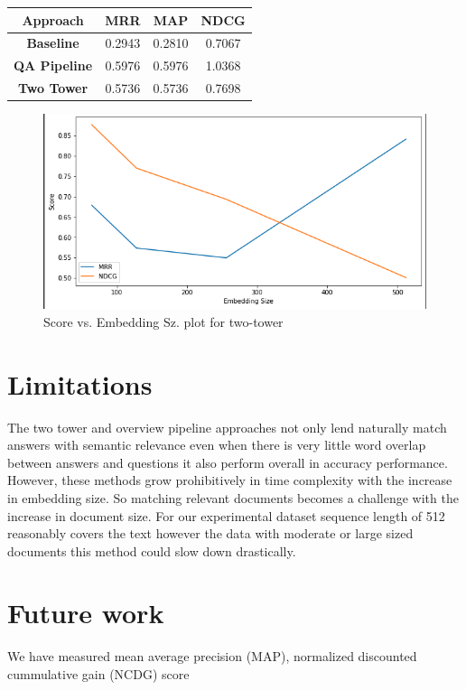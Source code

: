 \documentclass[11pt,a4paper]{article}
\begin{document}
\begin{center}
\begin{tabular}{||c c c c||} 
 \hline
 \textbf{Approach} & \textbf{MRR} & \textbf{MAP} & \textbf{NDCG} \\ [0.5ex] 
 \hline\hline
 \textbf{Baseline} & 0.2943 & 0.2810 & 0.7067 \\ 
 \hline
 \textbf{QA Pipeline} & 0.5976 & 0.5976 & 1.0368 \\
 \hline
 \textbf{Two Tower} & 0.5736 & 0.5736 & 0.7698 \\
 \hline

 \hline
\end{tabular}
\end{center}

\begin{figure}
  \includegraphics[width=\linewidth]{metric_plot.png}
  \caption{Score vs. Embedding Sz. plot for two-tower}
  \label{fig:two-tower model}
\end{figure}


\section{Limitations}
The two tower and overview pipeline approaches not only lend naturally match answers with semantic relevance even when there is very little word overlap between answers and questions it also perform overall in accuracy performance. However, these methods grow prohibitively in time complexity with the increase in embedding size. So matching relevant documents becomes a challenge with the increase in document size. For our experimental dataset sequence length of 512 reasonably covers the text however the data with moderate or large sized documents this method could slow down drastically. 

\section{Future work}
We have measured mean average precision (MAP), normalized discounted cummulative gain (NCDG) score
\end{document}
